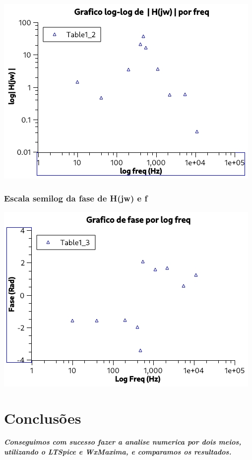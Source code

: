\documentclass[12pt,twoside, a4paper, twocolumn]{article}
\begin{document}
\begin{adjustbox}{scale=0.70}
    \includegraphics{Graph1.jpeg}
\end{adjustbox}

\subsubsection{Escala semilog da fase de H(jw) e f}
\begin{adjustbox}{scale=0.70}
    \includegraphics{Graph2.jpeg}
\end{adjustbox}

\section{Conclusões}

\subparagraph*{Conseguimos com sucesso fazer a analise numerica por dois meios, utilizando o LTSpice e WxMaxima, e comparamos os resultados.}
\end{document}
